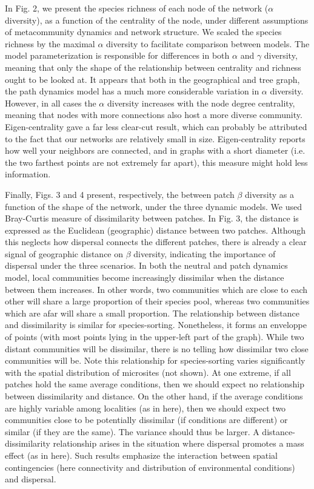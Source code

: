 \documentclass[12pt]{article}
\begin{document}
In Fig. 2, we present the species richness of each node of the network ($\alpha$
diversity), as a function of the centrality of the node, under different
assumptions of metacommunity dynamics and network structure. We scaled the
species richness by the maximal $\alpha$ diversity to facilitate comparison
between models. The model parameterization is responsible for differences in
both $\alpha$ and $\gamma$ diversity, meaning that only the shape of the
relationship between centrality and richness ought to be looked at. It appears
that both in the geographical and tree graph, the path dynamics model has a
much more considerable variation in $\alpha$ diversity.  However, in all
cases the $\alpha$ diversity increases with the node degree centrality, meaning
that nodes with more connections also host a more diverse community.
Eigen-centrality gave a far less clear-cut result, which can probably be
attributed to the fact that our networks are relatively small in size.
Eigen-centrality reports how well your neighbors are connected, and in graphs
with a short diameter (i.e. the two farthest points are not extremely far
apart), this measure might hold less information.

Finally, Figs. 3 and 4 present, respectively, the between patch $\beta$
diversity as a function of the shape of the network, under the three dynamic
models. We used Bray-Curtis measure of dissimilarity between patches. In Fig. 3,
the distance is expressed as the Euclidean (geographic) distance between two
patches. Although this neglects how dispersal connects the different patches,
there is already a clear signal of geographic distance on $\beta$ diversity,
indicating the importance of dispersal under the three scenarios. In both the
neutral and patch dynamics model, local communities become increasingly
dissimilar when the distance between them increases. In other words, two
communities which are close to each other will share a large proportion of their
species pool, whereas two communities which are afar will share a small
proportion. The relationship between distance and dissimilarity is similar for
species-sorting. Nonetheless, it forms an enveloppe of points (with most points
lying in the upper-left part of the graph). While two distant communities will
be dissimilar, there is no telling how dissimilar two close communities will be.
Note this relationship for species-sorting varies significantly with the spatial
distribution of microsites (not shown). At one extreme, if all patches hold the
same average conditions, then we should expect no relationship between
dissimilarity and distance. On the other hand, if the average conditions are
highly variable among localities (as in here), then we should expect two
communities close to be potentially dissimilar (if conditions are different) or
similar (if they are the same). The variance should thus be larger. A
distance-dissimilarity relationship arises in the situation where dispersal
promotes a mass effect (as in here). Such results emphasize the interaction
between spatial contingencies (here connectivity and distribution of
environmental conditions) and dispersal.
\end{document}
